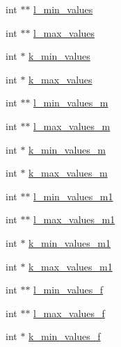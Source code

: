 \begin{DoxyCompactItemize}
\item 
int $\ast$$\ast$ \mbox{\hyperlink{group__kl__neighborhood__mfe_aa2f2e9bd13105d15a657e71f5261256b}{l\+\_\+min\+\_\+values}}
\item 
int $\ast$$\ast$ \mbox{\hyperlink{group__kl__neighborhood__mfe_a6df00730e6359d27b26290c95e3cf0fd}{l\+\_\+max\+\_\+values}}
\item 
int $\ast$ \mbox{\hyperlink{group__kl__neighborhood__mfe_aed74c3f883cab18bac7d9c66d8cff110}{k\+\_\+min\+\_\+values}}
\item 
int $\ast$ \mbox{\hyperlink{group__kl__neighborhood__mfe_adf0b5de14ba5fc0ab3788bc0ff4f9d88}{k\+\_\+max\+\_\+values}}
\item 
int $\ast$$\ast$ \mbox{\hyperlink{group__kl__neighborhood__mfe_a0c688cbbb88902a6642dad7fb41ca9f3}{l\+\_\+min\+\_\+values\+\_\+m}}
\item 
int $\ast$$\ast$ \mbox{\hyperlink{group__kl__neighborhood__mfe_a3bf30e9fb08b16e7c6a2706581a2e5cb}{l\+\_\+max\+\_\+values\+\_\+m}}
\item 
int $\ast$ \mbox{\hyperlink{group__kl__neighborhood__mfe_a9e942b87356975775dea195841fcf847}{k\+\_\+min\+\_\+values\+\_\+m}}
\item 
int $\ast$ \mbox{\hyperlink{group__kl__neighborhood__mfe_a85df676ac4b99098d72f6e8e48d6afc5}{k\+\_\+max\+\_\+values\+\_\+m}}
\item 
int $\ast$$\ast$ \mbox{\hyperlink{group__kl__neighborhood__mfe_a80f9152af7100a3c24d48cdf7639378b}{l\+\_\+min\+\_\+values\+\_\+m1}}
\item 
int $\ast$$\ast$ \mbox{\hyperlink{group__kl__neighborhood__mfe_afd0de56d6593a46ae805d0ec8d3651a2}{l\+\_\+max\+\_\+values\+\_\+m1}}
\item 
int $\ast$ \mbox{\hyperlink{group__kl__neighborhood__mfe_a5cc247c342c307157d972103602b011f}{k\+\_\+min\+\_\+values\+\_\+m1}}
\item 
int $\ast$ \mbox{\hyperlink{group__kl__neighborhood__mfe_a252a584f7f74c8b2787a128f05c9113d}{k\+\_\+max\+\_\+values\+\_\+m1}}
\item 
int $\ast$$\ast$ \mbox{\hyperlink{group__kl__neighborhood__mfe_a4a39ccf97d767d6bb62f34d6b1d10717}{l\+\_\+min\+\_\+values\+\_\+f}}
\item 
int $\ast$$\ast$ \mbox{\hyperlink{group__kl__neighborhood__mfe_a8a566aec285da022ff58f128044fd560}{l\+\_\+max\+\_\+values\+\_\+f}}
\item 
int $\ast$ \mbox{\hyperlink{group__kl__neighborhood__mfe_a01d07ecba1cfdf7f0c06d870368ebbab}{k\+\_\+min\+\_\+values\+\_\+f}}
\item 

\end{DoxyCompactItemize}
